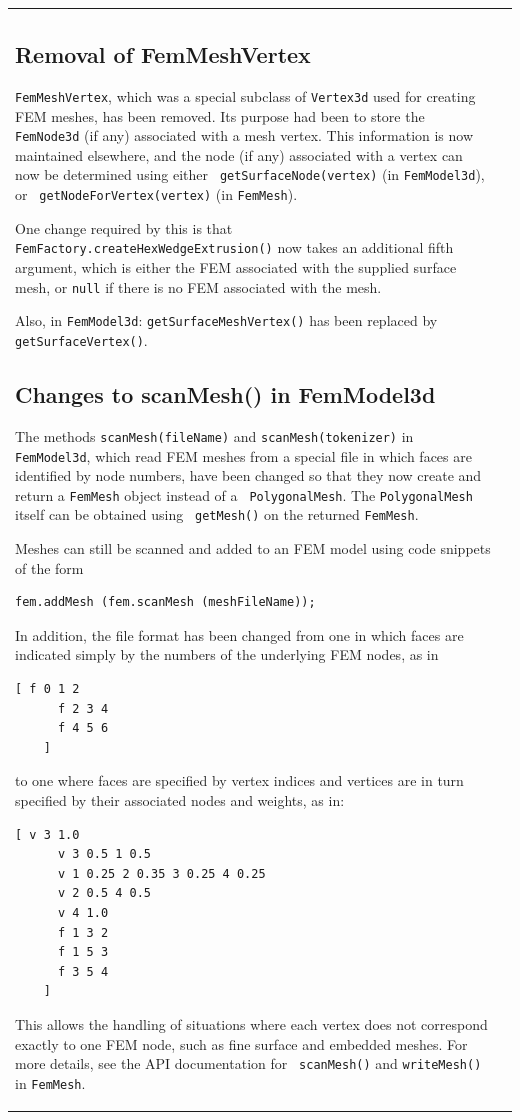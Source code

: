 \documentclass{article}
\begin{document}
\begin{tabular}{ll}
\subsection*{Removal of FemMeshVertex}

{\tt FemMeshVertex}, which was a special subclass of {\tt Vertex3d}
used for creating FEM meshes, has been removed. Its purpose had been
to store the {\tt FemNode3d} (if any) associated with a mesh vertex.
This information is now maintained elsewhere, and the node (if any)
associated with a vertex can now be determined using either {\tt
getSurfaceNode(vertex)} (in {\tt FemModel3d}), or {\tt
getNodeForVertex(vertex)} (in {\tt FemMesh}).

One change required by this is that {\tt
FemFactory.createHexWedgeExtrusion()} now takes an additional fifth
argument, which is either the FEM associated with the supplied surface
mesh, or {\tt null} if there is no FEM associated with the mesh.

Also, in {\tt FemModel3d}: {\tt getSurfaceMeshVertex()} has been
replaced by {\tt getSurfaceVertex()}.

\subsection*{Changes to scanMesh() in FemModel3d}

The methods {\tt scanMesh(fileName)} and {\tt scanMesh(tokenizer)} in
{\tt FemModel3d}, which read FEM meshes from a special file in which
faces are identified by node numbers, have been changed so that they
now create and return a {\tt FemMesh} object instead of a {\tt
PolygonalMesh}. The {\tt PolygonalMesh} itself can be obtained using {\tt
getMesh()} on the returned {\tt FemMesh}.

Meshes can still be scanned and added to an FEM model using
code snippets of the form
%
\begin{lstlisting}[]
   fem.addMesh (fem.scanMesh (meshFileName));
\end{lstlisting}
%

In addition, the file format has been changed from one in which faces
are indicated simply by the numbers of the underlying FEM nodes, as in
%
\begin{lstlisting}[]
    [ f 0 1 2
      f 2 3 4
      f 4 5 6
    ]
\end{lstlisting}
%
to one where faces are specified by vertex indices and vertices are in
turn specified by their associated nodes and weights, as in:
%
\begin{lstlisting}[]
    [ v 3 1.0
      v 3 0.5 1 0.5
      v 1 0.25 2 0.35 3 0.25 4 0.25
      v 2 0.5 4 0.5
      v 4 1.0
      f 1 3 2
      f 1 5 3
      f 3 5 4
    ]
\end{lstlisting}
%
This allows the handling of situations where each vertex does not
correspond exactly to one FEM node, such as fine surface and embedded
meshes. For more details, see the API documentation for {\tt
scanMesh()} and {\tt writeMesh()} in {\tt FemMesh}.


\end{tabular}
\end{document}
